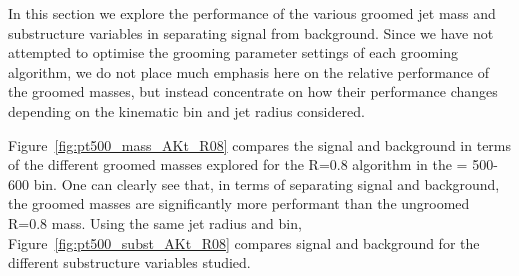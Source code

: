 In this section we  explore the performance of the various groomed
jet mass and substructure variables in separating signal
from background.
Since we
have not attempted to optimise the grooming parameter settings of
each grooming algorithm, we do not place much emphasis
here on the relative performance of the groomed masses, but instead
concentrate on how their performance changes depending on the
kinematic bin and jet radius considered. 

Figure~\ref{fig:pt500_mass_AKt_R08}  compares the signal and
background in terms of the different groomed masses explored for the
\antikt R=0.8 algorithm in the \pT = 500-600 bin. One can clearly see
that, in terms of separating signal and background, the groomed masses
are significantly more performant than the ungroomed \antikt R=0.8
mass. Using the same jet radius and \pT bin, Figure~\ref{fig:pt500_subst_AKt_R08}
compares signal and background for the different substructure variables
studied. 

